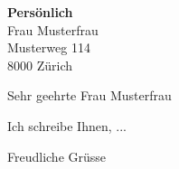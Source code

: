 \documentclass{Classes/custom_letter}
\date{\today}
\begin{document}
\begin{letter}{
		\textbf{Persönlich}\\
		Frau Musterfrau\\
		Musterweg 114\\
		8000 Zürich
	}

	\opening{Sehr geehrte Frau Musterfrau}

	Ich schreibe Ihnen, ...

	\closing{Freudliche Grüsse}

\end{letter}
\end{document}
